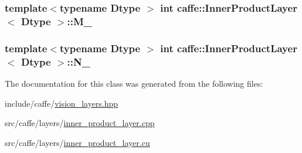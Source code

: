\hypertarget{classcaffe_1_1_inner_product_layer_a7cfcde40b118c74a0e85aa3b58e8aa07}{
\subsubsection[{M\+\_\+}]{\setlength{\rightskip}{0pt plus 5cm}template$<$typename Dtype $>$ int {\bf caffe\+::\+Inner\+Product\+Layer}$<$ Dtype $>$\+::M\+\_\+\hspace{0.3cm}{\ttfamily [protected]}}}\label{classcaffe_1_1_inner_product_layer_a7cfcde40b118c74a0e85aa3b58e8aa07}
\hypertarget{classcaffe_1_1_inner_product_layer_a863f699772bf8b8d978d6ec8bca42463}{
\subsubsection[{N\+\_\+}]{\setlength{\rightskip}{0pt plus 5cm}template$<$typename Dtype $>$ int {\bf caffe\+::\+Inner\+Product\+Layer}$<$ Dtype $>$\+::N\+\_\+\hspace{0.3cm}{\ttfamily [protected]}}}\label{classcaffe_1_1_inner_product_layer_a863f699772bf8b8d978d6ec8bca42463}


The documentation for this class was generated from the following files\+:\begin{DoxyCompactItemize}
\item 
include/caffe/\hyperlink{vision__layers_8hpp}{vision\+\_\+layers.\+hpp}\item 
src/caffe/layers/\hyperlink{inner__product__layer_8cpp}{inner\+\_\+product\+\_\+layer.\+cpp}\item 
src/caffe/layers/\hyperlink{inner__product__layer_8cu}{inner\+\_\+product\+\_\+layer.\+cu}\end{DoxyCompactItemize}

